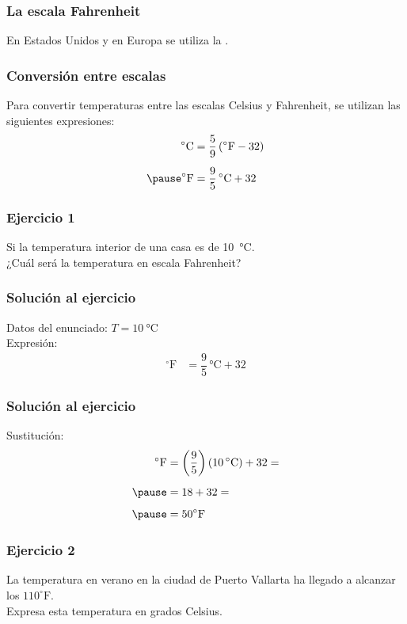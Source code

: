 \documentclass[14pt]{beamer}
\begin{document}
\begin{frame}
\frametitle{La escala Fahrenheit}
En Estados Unidos y en Europa se utiliza la .%
\end{frame}
\begin{frame}
\frametitle{Conversión entre escalas}
Para convertir temperaturas entre las escalas Celsius y Fahrenheit, se utilizan las siguientes expresiones:
\pause
\begin{eqnarray*}
\begin{aligned}
\unit{\degreeCelsius} &= \dfrac{5}{9} \left( ^{\circ}\text{F} - 32 \right) \\[0.5em] \pause
^{\circ}\text{F} &= \dfrac{9}{5} \, \unit{\degreeCelsius} + 32
\end{aligned}
\end{eqnarray*}
\end{frame}
\begin{frame}
\frametitle{Ejercicio 1}
Si la temperatura interior de una casa es de \SI{10}{\degreeCelsius}.
\\
\bigskip
\pause
¿Cuál será la temperatura en escala Fahrenheit?
\end{frame}
\begin{frame}
\frametitle{Solución al ejercicio}
Datos del enunciado: $T = \SI{10}{\degreeCelsius}$
\\
\bigskip
\pause
Expresión:
\pause
\begin{align*}
^{\circ}\text{F} &= \dfrac{9}{5} \, \unit{\degreeCelsius} + 32
\end{align*}
\end{frame}
\begin{frame}
\frametitle{Solución al ejercicio}
Sustitución:
\pause
\begin{eqnarray*}
\begin{aligned}
^{\circ}\text{F} &= \left( \dfrac{9}{5}\right) \left( \SI{10}{\degreeCelsius} \right) + 32 = \\[0.5em] \pause
&= 18 + 32 = \\[0.5em] \pause
&=50 ^{\circ} \text{F}
\end{aligned}
\end{eqnarray*}
\end{frame}
\begin{frame}
\frametitle{Ejercicio 2}
La temperatura en verano en la ciudad de Puerto Vallarta ha llegado a alcanzar los $110 ^{\circ} \text{F}$.
\\
\bigskip
\pause
Expresa esta temperatura en grados Celsius.
\end{frame}
\end{document}

